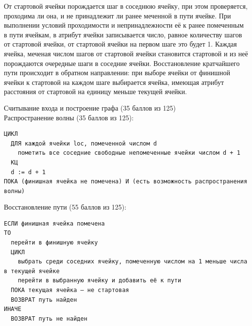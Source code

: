 \documentclass[10pt]{exam}
\begin{document}
\begin{questions}
{\begin{multicols}{2}
От стартовой ячейки порождается шаг в соседнюю ячейку, при этом проверяется, проходима ли она, и не принадлежит ли ранее меченной в пути ячейке. При выполнении условий проходимости и непринадлежности её к ранее помеченным в пути ячейкам, в атрибут ячейки записывается число, равное количеству шагов от стартовой ячейки, от стартовой ячейки на первом шаге это будет 1. Каждая ячейка, меченая числом шагов от стартовой ячейки становится стартовой и из неё порождаются очередные шаги в соседние ячейки. 
Восстановление кратчайшего пути происходит в обратном направлении: при выборе ячейки от финишной ячейки к стартовой на каждом шаге выбирается ячейка, имеющая атрибут расстояния от стартовой на единицу меньше текущей ячейки. 
\end{multicols}
Считывание входа и построение графа (35 баллов из 125)\\
Распространение волны (35 баллов из 125):
\begin{verbatim}
ЦИКЛ
  ДЛЯ каждой ячейки loc, помеченной числом d
    пометить все соседние свободные непомеченные ячейки числом d + 1
  КЦ
  d := d + 1
ПОКА (финишная ячейка не помечена) И (есть возможность распространения волны) 
\end{verbatim}
Восстановление пути (55 баллов из 125):
\begin{verbatim}
ЕСЛИ финишная ячейка помечена
ТО
  перейти в финишную ячейку
  ЦИКЛ
    выбрать среди соседних ячейку, помеченную числом на 1 меньше числа в текущей ячейке
    перейти в выбранную ячейку и добавить её к пути
  ПОКА текущая ячейка — не стартовая
  ВОЗВРАТ путь найден
ИНАЧЕ
  ВОЗВРАТ путь не найден
\end{verbatim}

}


\end{questions}
\end{document}
